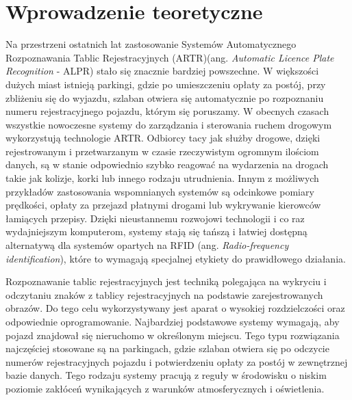 %


\chapter{Wprowadzenie teoretyczne}

Na przestrzeni ostatnich lat zastosowanie Systemów Automatycznego Rozpoznawania Tablic Rejestracyjnych (ARTR)(ang. \textit{Automatic Licence Plate Recognition} - ALPR) stało się znacznie bardziej powszechne.
W większości dużych miast istnieją parkingi, gdzie po umieszczeniu opłaty za postój, przy zbliżeniu się do wyjazdu, szlaban otwiera się automatycznie po rozpoznaniu numeru rejestracyjnego pojazdu, którym się poruszamy.
W obecnych czasach wszystkie nowoczesne systemy do zarządzania i sterowania ruchem drogowym wykorzystują technologie ARTR.
Odbiorcy tacy jak służby drogowe, dzięki rejestrowanym i przetwarzanym w czasie rzeczywistym ogromnym ilościom danych, są w stanie odpowiednio szybko reagować na wydarzenia na drogach takie jak kolizje, korki lub innego rodzaju utrudnienia.
Innym z możliwych przykładów zastosowania wspomnianych systemów są odcinkowe pomiary prędkości, opłaty za przejazd płatnymi drogami lub wykrywanie kierowców łamiących przepisy.
Dzięki nieustannemu rozwojowi technologii i co raz wydajniejszym komputerom, systemy stają się tańszą i łatwiej dostępną alternatywą dla systemów opartych na RFID (ang. \textit{Radio-frequency identification}), które to wymagają specjalnej etykiety do prawidłowego działania.

Rozpoznawanie tablic rejestracyjnych jest techniką polegająca na wykryciu i odczytaniu znaków z tablicy rejestracyjnych na podstawie zarejestrowanych obrazów.
Do tego celu wykorzystywany jest aparat o wysokiej rozdzielczości oraz odpowiednie oprogramowanie.
Najbardziej podstawowe systemy wymagają, aby pojazd znajdował się nieruchomo w określonym miejscu.
Tego typu rozwiązania najczęściej stosowane są na parkingach, gdzie szlaban otwiera się po odczycie numerów rejestracyjnych pojazdu i potwierdzeniu opłaty za postój w zewnętrznej bazie danych.
Tego rodzaju systemy pracują z reguły w środowisku o niskim poziomie zakłóceń wynikających z warunków atmosferycznych i oświetlenia.

